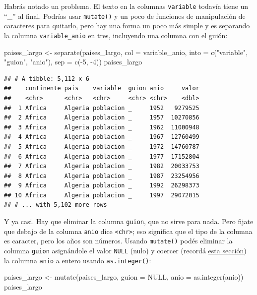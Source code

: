 \documentclass[
  openany]{book}
\newenvironment{Shaded}{\begin{snugshade}}{\end{snugshade}}
\newcommand{\AttributeTok}[1]{\textcolor[rgb]{0.77,0.63,0.00}{#1}}
\newcommand{\ConstantTok}[1]{\textcolor[rgb]{0.00,0.00,0.00}{#1}}
\newcommand{\DecValTok}[1]{\textcolor[rgb]{0.00,0.00,0.81}{#1}}
\newcommand{\FunctionTok}[1]{\textcolor[rgb]{0.00,0.00,0.00}{#1}}
\newcommand{\NormalTok}[1]{#1}
\newcommand{\OtherTok}[1]{\textcolor[rgb]{0.56,0.35,0.01}{#1}}
\newcommand{\SpecialCharTok}[1]{\textcolor[rgb]{0.00,0.00,0.00}{#1}}
\newcommand{\StringTok}[1]{\textcolor[rgb]{0.31,0.60,0.02}{#1}}
\begin{document}
Habrás notado un problema.
El texto en la columnas \texttt{variable} todavía tiene un ``\_'' al final.
Podrías usar \texttt{mutate()} y un poco de funciones de manipulación de caracteres para quitarlo, pero hay una forma un poco más simple y es separando la columna \texttt{variable\_anio} en tres, incluyendo una columna con el guión:

\begin{Shaded}
\begin{Highlighting}[]
\NormalTok{paises\_largo }\OtherTok{\textless{}{-}} \FunctionTok{separate}\NormalTok{(paises\_largo, }
         \AttributeTok{col =}\NormalTok{ variable\_anio, }
         \AttributeTok{into =} \FunctionTok{c}\NormalTok{(}\StringTok{"variable"}\NormalTok{, }\StringTok{"guion"}\NormalTok{, }\StringTok{"anio"}\NormalTok{), }
         \AttributeTok{sep =} \FunctionTok{c}\NormalTok{(}\SpecialCharTok{{-}}\DecValTok{5}\NormalTok{, }\SpecialCharTok{{-}}\DecValTok{4}\NormalTok{))}
\NormalTok{paises\_largo}
\end{Highlighting}
\end{Shaded}

\begin{verbatim}
## # A tibble: 5,112 x 6
##    continente pais    variable  guion anio     valor
##    <chr>      <chr>   <chr>     <chr> <chr>    <dbl>
##  1 Africa     Algeria poblacion _     1952   9279525
##  2 Africa     Algeria poblacion _     1957  10270856
##  3 Africa     Algeria poblacion _     1962  11000948
##  4 Africa     Algeria poblacion _     1967  12760499
##  5 Africa     Algeria poblacion _     1972  14760787
##  6 Africa     Algeria poblacion _     1977  17152804
##  7 Africa     Algeria poblacion _     1982  20033753
##  8 Africa     Algeria poblacion _     1987  23254956
##  9 Africa     Algeria poblacion _     1992  26298373
## 10 Africa     Algeria poblacion _     1997  29072015
## # ... with 5,102 more rows
\end{verbatim}

Y ya casi.
Hay que eliminar la columna \texttt{guion}, que no sirve para nada.
Pero fijate que debajo de la columna \texttt{anio} dice \texttt{\textless{}chr\textgreater{}}; eso significa que el tipo de la columna es caracter, pero los años son números.
Usando \texttt{mutate()} podés eliminar la columna \texttt{guion} asignándole el valor \texttt{NULL} (nulo) y coercer (recordá \href{04-lectura-datos.html\#Vectores}{esta sección}) la columna \texttt{anio} a entero usando \texttt{as.integer()}:

\begin{Shaded}
\begin{Highlighting}[]
\NormalTok{paises\_largo }\OtherTok{\textless{}{-}} \FunctionTok{mutate}\NormalTok{(paises\_largo, }
                       \AttributeTok{guion =} \ConstantTok{NULL}\NormalTok{,}
                       \AttributeTok{anio =} \FunctionTok{as.integer}\NormalTok{(anio))}
\NormalTok{paises\_largo}
\end{Highlighting}
\end{Shaded}
\end{document}
